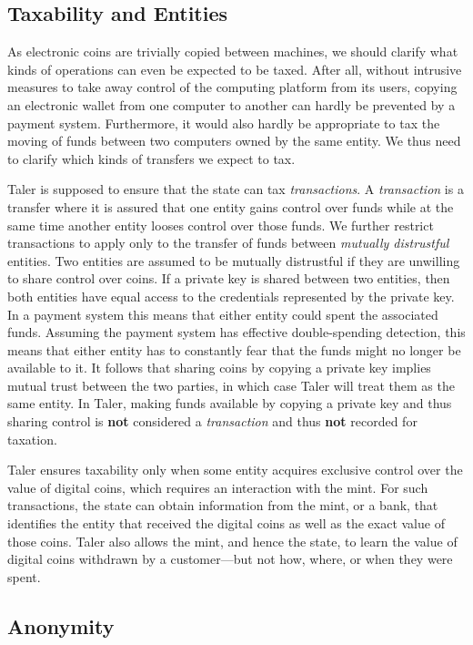 \documentclass{llncs}
\begin{document}
\subsection{Taxability and Entities}

As electronic coins are trivially copied between machines, we should
clarify what kinds of operations can even be expected to be taxed.
After all, without intrusive measures to take away control of the
computing platform from its users, copying an electronic wallet from
one computer to another can hardly be prevented by a payment system.
Furthermore, it would also hardly be appropriate to tax the moving of
funds between two computers owned by the same entity.  We thus
need to clarify which kinds of transfers we expect to tax.

Taler is supposed to ensure that the state can tax {\em transactions}.
A {\em transaction} is a transfer where it is assured that one entity
gains control over funds while at the same time another entity looses
control over those funds.  We further restrict transactions to apply
only to the transfer of funds between {\em mutually distrustful}
entities.  Two entities are assumed to be mutually distrustful if they
are unwilling to share control over coins.  If a private key is shared
between two entities, then both entities have equal access to the
credentials represented by the private key.  In a payment system this
means that either entity could spent the associated funds.  Assuming
the payment system has effective double-spending detection, this means
that either entity has to constantly fear that the funds might no
longer be available to it.  It follows that sharing coins by copying
a private key implies mutual trust between the two parties, in which
case Taler will treat them as the same entity.  
In Taler, making funds available by copying a private key and thus
sharing control is {\bf not} considered a {\em transaction} and 
thus {\bf not} recorded for taxation.

Taler ensures taxability only when some entity acquires exclusive
control over the value of digital coins, which requires an interaction
with the mint.  For such transactions, the state can obtain information
from the mint, or a bank, that identifies the entity that received the
digital coins as well as the exact value of those coins.  
Taler also allows the mint, and hence the state, to learn the value of 
digital coins withdrawn by a customer---but not how, where, or when
they were spent.

\subsection{Anonymity}
\end{document}
